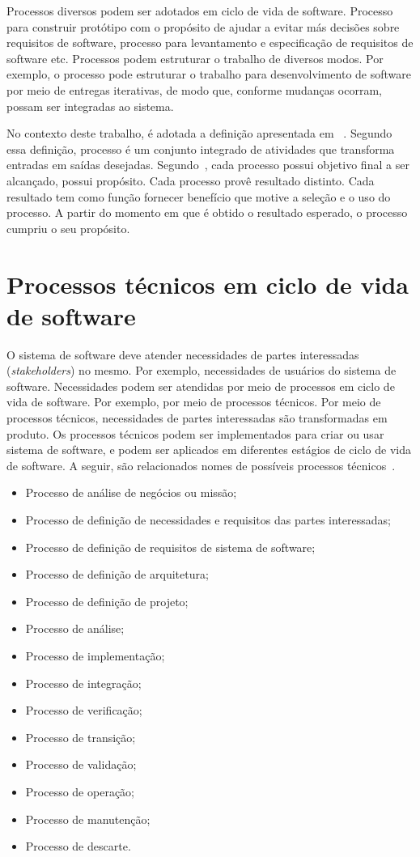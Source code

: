 Processos diversos podem ser adotados em ciclo de vida de software. Processo para construir protótipo com o propósito de ajudar a evitar más decisões sobre requisitos de software, processo para levantamento e especificação de requisitos de software etc. Processos podem estruturar o trabalho de diversos modos. Por exemplo, o processo pode estruturar o trabalho para desenvolvimento de software por meio de entregas iterativas, de modo que, conforme mudanças ocorram, possam ser integradas ao sistema.

No contexto deste trabalho, é adotada a definição apresentada em ~\cite{ISO_247483}. Segundo essa definição, processo é um conjunto integrado de atividades que transforma entradas em saídas desejadas. Segundo~\cite{ISO_247483}, cada processo possui objetivo final a ser alcançado, possui propósito. Cada processo provê resultado distinto. Cada resultado tem como função fornecer benefício que motive a seleção e o uso do processo. A partir do momento em que é obtido o resultado esperado, o processo cumpriu o seu propósito.

\section{Processos técnicos em ciclo de vida de software}

O sistema de software deve atender necessidades de partes interessadas (\emph{stakeholders}) no mesmo. Por exemplo, necessidades de usuários do sistema de software. Necessidades podem ser atendidas por meio de processos em ciclo de vida de software. Por exemplo, por meio de processos técnicos. Por meio de processos técnicos, necessidades de partes interessadas são transformadas em produto. Os processos técnicos podem ser implementados para criar ou usar sistema de software, e podem ser aplicados em diferentes estágios de ciclo de vida de software. A seguir, são relacionados nomes de possíveis processos técnicos~\cite{ISO_12207}.

\begin{itemize}
    \item Processo de análise de negócios ou missão;
    \item Processo de definição de necessidades e requisitos das partes interessadas;
    \item Processo de definição de requisitos de sistema de software;
    \item Processo de definição de arquitetura;
    \item Processo de definição de projeto;
    \item Processo de análise;
    \item Processo de implementação;
    \item Processo de integração;
    \item Processo de verificação;
    \item Processo de transição;
    \item Processo de validação;
    \item Processo de operação;
    \item Processo de manutenção;
    \item Processo de descarte. 
\end{itemize}
      
